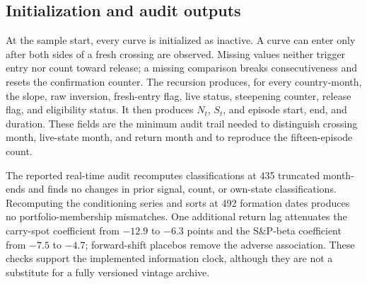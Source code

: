 

\subsection{Initialization and audit outputs}

At the sample start, every curve is initialized as inactive. A curve can enter only after both sides of a fresh crossing are observed. Missing values neither trigger entry nor count toward release; a missing comparison breaks consecutiveness and resets the confirmation counter. The recursion produces, for every country-month, the slope, raw inversion, fresh-entry flag, live status, steepening counter, release flag, and eligibility status. It then produces $N_t$, $S_t$, and episode start, end, and duration. These fields are the minimum audit trail needed to distinguish crossing month, live-state month, and return month and to reproduce the fifteen-episode count.

The reported real-time audit recomputes classifications at 435 truncated month-ends and finds no changes in prior signal, count, or own-state classifications. Recomputing the conditioning series and sorts at 492 formation dates produces no portfolio-membership mismatches. One additional return lag attenuates the carry-spot coefficient from $-12.9$ to $-6.3$ points and the S\&P-beta coefficient from $-7.5$ to $-4.7$; forward-shift placebos remove the adverse association. These checks support the implemented information clock, although they are not a substitute for a fully versioned vintage archive.
